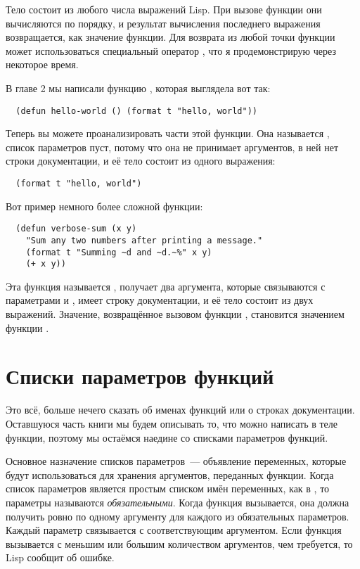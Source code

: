 Тело  состоит из любого числа выражений Lisp.  При вызове функции они
вычисляются по порядку, и результат вычисления последнего выражения возвращается, как
значение функции.  Для возврата из любой точки функции может использоваться специальный
оператор , что я продемонстрирую через некоторое время.

В главе 2 мы написали функцию , которая выглядела вот так:

\begin{lstlisting}
  (defun hello-world () (format t "hello, world"))
\end{lstlisting}

Теперь вы можете проанализировать части этой функции.  Она называется ,
список параметров пуст, потому что она не принимает аргументов, в ней нет строки
документации, и её тело состоит из одного выражения:

\begin{lstlisting}
  (format t "hello, world")
\end{lstlisting}

Вот пример немного более сложной функции:

\begin{lstlisting}
  (defun verbose-sum (x y)
    "Sum any two numbers after printing a message."
    (format t "Summing ~d and ~d.~%" x y)
    (+ x y))
\end{lstlisting}

Эта функция называется , получает два аргумента, которые связываются с
параметрами  и , имеет строку документации, и её тело состоит из двух
выражений.  Значение, возвращённое вызовом функции \code{+}, становится значением функции
.

\section{Списки параметров функций}

Это всё, больше нечего сказать об именах функций или о строках документации. Оставшуюся
часть книги мы будем описывать то, что можно написать в теле функции, поэтому мы остаёмся
наедине со списками параметров функций.

Основное назначение списков параметров~--- объявление переменных, которые будут
использоваться для хранения аргументов, переданных функции.  Когда список параметров
является простым списком имён переменных, как в , то параметры
называются \textit{обязательными}.  Когда функция вызывается, она должна получить ровно по
одному аргументу для каждого из обязательных параметров.  Каждый параметр связывается с
соответствующим аргументом.  Если функция вызывается с меньшим или большим количеством
аргументов, чем требуется, то Lisp сообщит об ошибке.

